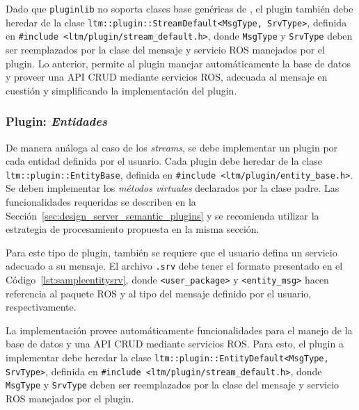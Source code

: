 Dado que \texttt{pluginlib} no soporta clases base genéricas de \CC, el plugin también debe heredar de la clase \texttt{ltm::plugin::StreamDefault\textless MsgType, SrvType\textgreater}, definida en \texttt{\#include \textless ltm/plugin/stream\_default.h\textgreater}, donde \texttt{MsgType} y \texttt{SrvType} deben ser reemplazados por la clase del mensaje y servicio ROS manejados por el plugin. Lo anterior, permite al plugin manejar automáticamente la base de datos y proveer una API CRUD mediante servicios ROS, adecuada al mensaje en cuestión y simplificando la implementación del plugin.


\subsubsection{Plugin: \textit{Entidades}}

De manera análoga al caso de los \textit{streams}, se debe implementar un plugin por cada entidad definida por el usuario. Cada plugin debe heredar de la clase \texttt{ltm::plugin::EntityBase}, definida en \texttt{\#include \textless ltm/plugin/entity\_base.h\textgreater}. Se deben implementar los \textit{métodos virtuales} declarados por la clase padre. Las funcionalidades requeridas se describen en la Sección~\ref{sec:design_server_semantic_plugins} y se recomienda utilizar la estrategia de procesamiento propuesta en la misma sección.

Para este tipo de plugin, también se requiere que el usuario defina un servicio adecuado a su mensaje. El archivo \texttt{.srv} debe tener el formato presentado en el Código~\ref{lst:sampleentitysrv}, donde \texttt{\textless user\_package\textgreater} y \texttt{\textless entity\_msg\textgreater} hacen referencia al paquete ROS y al tipo del mensaje definido por el usuario, respectivamente.
\lstset{style=/Style/ROS/MSG}


La implementación provee automáticamente funcionalidades para el manejo de la base de datos y una API CRUD mediante servicios ROS. Para esto, el plugin a implementar debe heredar la clase \texttt{ltm::plugin::EntityDefault\textless MsgType, SrvType\textgreater}, definida en \texttt{\#include \textless ltm/plugin/stream\_default.h\textgreater}, donde \texttt{MsgType} y \texttt{SrvType} deben ser reemplazados por la clase del mensaje y servicio ROS manejados por el plugin.


